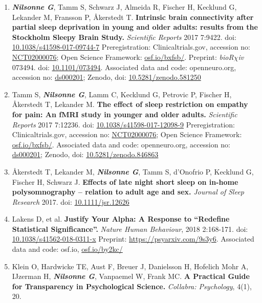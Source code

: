 \documentclass[10pt]{article}
\begin{document}
\begin{enumerate}[nolistsep]
\item \textbf{\textit{Nilsonne G}}, Tamm S, Schwarz J, Almeida R, Fischer H, Kecklund G, Lekander M, Fransson P, Åkerstedt T. \textbf{Intrinsic brain connectivity after partial sleep deprivation in young and older adults: results from the Stockholm Sleepy Brain Study.} \textit{Scientific Reports} 2017 7:9422. doi: \href{http://doi.org/10.1038/s41598-017-09744-7}{10.1038/s41598-017-09744-7}
Preregistration: Clinicaltrials.gov, accession no: \href{https://clinicaltrials.gov/ct2/show/NCT02000076}{NCT02000076}; Open Science Framework: \href{https://osf.io/bxfsb/}{osf.io/bxfsb/}. Preprint: \emph{bioR$\chi$iv} 073494. doi: \href{http://dx.doi.org/10.1101/073494}{10.1101/073494}. Associated data and code: openneuro.org, accession no: \href{https://openneuro.org/dataset/ds000201/}{ds000201}; Zenodo, doi: \href{http://doi.org/10.5281/zenodo.581250}{10.5281/zenodo.581250}
\item Tamm S, \textbf{\textit{Nilsonne G}}, Lamm C, Kecklund G, Petrovic P, Fischer H, Åkerstedt T, Lekander M. \textbf{The effect of sleep restriction on empathy for pain: An fMRI study in younger and older adults.} \textit{Scientific Reports} 2017 7:12236. doi: \href{http://doi.org/10.1038/s41598-017-12098-9}{10.1038/s41598-017-12098-9}
Preregistration: Clinicaltrials.gov, accession no: \href{https://clinicaltrials.gov/ct2/show/NCT02000076}{NCT02000076}; Open Science Framework: \href{https://osf.io/bxfsb/}{osf.io/bxfsb/}. Associated data and code: openneuro.org, accession no: \href{https://openneuro.org/dataset/ds000201/}{ds000201}; Zenodo, doi: \href{https://doi.org/10.5281/zenodo.846863}{10.5281/zenodo.846863}
\item Åkerstedt T, Lekander M, \textbf{\textit{Nilsonne G}}, Tamm S, d'Onofrio P, Kecklund G, Fischer H, Schwarz J. \textbf{Effects of late night short sleep on in-home polysomnography – relation to adult age and sex.} \textit{Journal of Sleep Research} 2017. doi: \href{https://doi.org/10.1111/jsr.12626}{10.1111/jsr.12626}
\item Lakens D, et al. \textbf{Justify Your Alpha: A Response to “Redefine Statistical Significance”.} \emph{Nature Human Behaviour}, 2018 2:168-171. doi: \href{http://doi.org/10.1038/s41562-018-0311-x}{10.1038/s41562-018-0311-x} Preprint: \href{https://psyarxiv.com/9s3y6}{https://psyarxiv.com/9s3y6}.
Associated data and code: osf.io, \href{https://osf.io/by2kc/}{osf.io/by2kc/}
\item Klein O, Hardwicke TE, Aust F, Breuer J, Danielsson H, Hofelich Mohr A, IJzerman H, \textbf{\textit{Nilsonne G}}, Vanpaemel W, Frank MC. \textbf{A Practical Guide for Transparency in Psychological Science.} \emph{Collabra: Psychology}, 4(1), 20. 

\end{enumerate}
\end{document}
